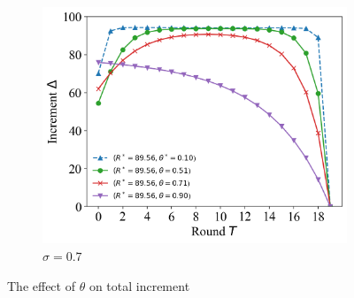 \documentclass{article}
\theoremstyle{plain}
\theoremstyle{definition}
\theoremstyle{remark}
\begin{document}
\begin{figure}
\begin{subfigure}{0.31\textwidth}
		\includegraphics[width=\textwidth]{figures/figure_62_C.png}
    \caption{$\sigma=0.7$}
	\end{subfigure}
	\caption{The effect of $\theta$ on total increment}
\end{figure}
\end{document}
